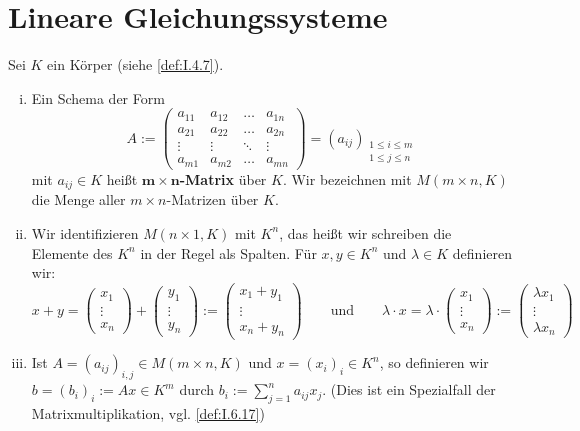\setcounter{section}{2}
\section{Lineare Gleichungssysteme}
\setcounter{definition}{4}
\begin{definition}[Matrix]
	\label{def:I.3.5}
	Sei $K$ ein Körper (siehe \autoref{def:I.4.7}).
	\begin{enumerate}[(i)]
		\item Ein Schema der Form
		\[
			A := \begin{pmatrix}
				a_{11} & a_{12} & \dots & a_{1n} \\
				a_{21} & a_{22} & \dots & a_{2n} \\
				\vdots & \vdots & \ddots & \vdots \\
				a_{m1} & a_{m2} & \dots & a_{mn}
			\end{pmatrix} = (a_{ij})_{\substack{1 \leq i \leq m \\ 1 \leq j \leq n}}
		\]
		mit $a_{ij} \in K$ heißt $\bm{m \times n}$\textbf{-Matrix} über $K$. 
		Wir bezeichnen mit $M(m \times n,K)$ die Menge aller $m \times n$-Matrizen über $K$.
		\item Wir identifizieren $M(n \times 1,K)$ mit $K^n$, das heißt wir schreiben die Elemente des $K^n$ in der Regel als Spalten.
		Für $x,y \in K^n$ und $\lambda \in K$ definieren wir:
		\[
			x+y = \begin{pmatrix} x_1 \\ \vdots \\ x_n \end{pmatrix} + \begin{pmatrix} y_1 \\ \vdots \\ y_n \end{pmatrix} := \begin{pmatrix} x_1 + y_1 \\ \vdots \\ x_n + y_n \end{pmatrix} \qquad \text{und} \qquad \lambda \cdot x = \lambda \cdot \begin{pmatrix} x_1 \\ \vdots \\ x_n \end{pmatrix} := \begin{pmatrix} \lambda x_1 \\ \vdots \\ \lambda x_n \end{pmatrix}
		\]
		\item Ist $A = (a_{ij})_{i,j} \in M(m \times n,K)$ und $x = (x_i)_i \in K^n$, so definieren wir $b = (b_i)_i := Ax \in K^m$ durch $b_i := \sum\limits_{j=1}^n a_{ij}x_j$.
		(Dies ist ein Spezialfall der Matrixmultiplikation, vgl. \autoref{def:I.6.17})
	\end{enumerate}
\end{definition}

